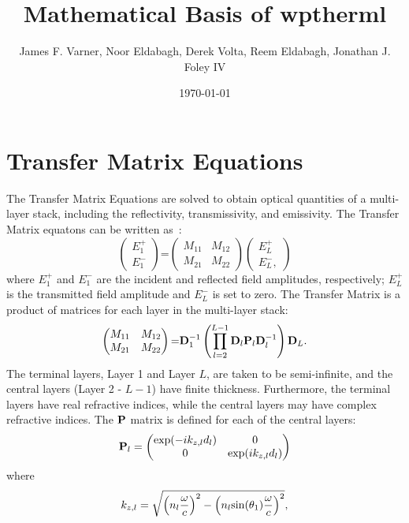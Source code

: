 \documentclass[journal=jpclcd,manuscript=suppinfo]{achemso}
\author{James F. Varner, Noor Eldabagh, Derek Volta, Reem Eldabagh, Jonathan J. Foley IV}
\affiliation{Department of Chemistry, William Paterson University, 300 Pompton Road, Wayne, NJ, 07470, USA}
\title{Mathematical Basis of wptherml}
\date{\today}
\begin{document}
\section{Transfer Matrix Equations}
The Transfer Matrix Equations are solved to obtain optical quantities
of a multi-layer stack, including the reflectivity, transmissivity,
and emissivity.  The Transfer Matrix equatons can be written as~\cite{Yeh}:
\begin{equation}
  \begin{pmatrix}
  E_1^+ \\
  E_1^-
  \end{pmatrix} 
  \mbox{=}
  \begin{pmatrix}
    M_{11}    &     M_{12}   \\
    M_{21}    &     M_{22}   
  \end{pmatrix}
  \begin{pmatrix}
  E_L^+ \\
  E_L^-,
  \end{pmatrix}
\end{equation}
where $E_1^+$ and $E_1^-$ are the incident and reflected field amplitudes,
respectively;  $E_L^+$ is the transmitted field amplitude and $E_L^-$ is set
to zero.  The Transfer Matrix is a product of matrices for each layer
in the multi-layer stack:
\begin{equation}
\begin{pmatrix}
    M_{11}    &     M_{12}   \\
    M_{21}    &     M_{22}   
  \end{pmatrix}
\mbox{=}
{\bf D}_1^{-1} \left( \prod_{l=2}^{L-1} {\bf D}_l {\bf P}_l {\bf D}_l^{-1}
\right) {\bf D}_L.
\end{equation}
The terminal layers, Layer 1 and Layer $L$, are taken to be semi-infinite, and the central
layers (Layer 2 - $L-1$) have finite thickness.  Furthermore,
the terminal layers have real refractive indices, while the central
layers may have complex refractive indices.
The ${\bf P}$ matrix is defined for each of the central
layers:
\begin{equation}
{\bf P}_l = 
\begin{pmatrix}
    {\rm exp}(-i k_{z,l} d_l)    &     0   \\
    0    &     {\rm exp}(i k_{z,l} d_l)    
\end{pmatrix}
\end{equation}
where 
\begin{equation}
k_{z,l} = \sqrt{\left(n_l \frac{\omega}{c}  \right)^2 - \left( n_l {\rm sin}(\theta_1) \frac{\omega}{c} \right)^2 },
\end{equation}
\end{document}
